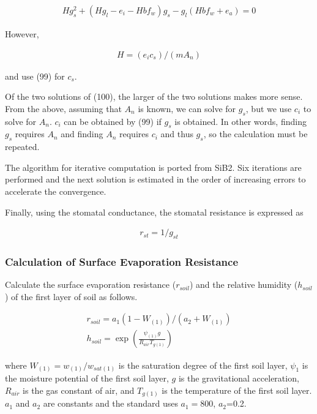 \begin{eqnarray}
 H g_s^2 + ( H g_l - e_i - H b f_w ) g_s - g_l ( H b f_w + e_a ) = 0
\end{eqnarray}

However,

\begin{eqnarray}
 H = (e_i c_s)/(m A_n)
\end{eqnarray}

and use (99) for \(c_s\).

Of the two solutions of (100), the larger of the two solutions makes
more sense. From the above, assuming that \(A_n\) is known, we can solve
for \(g_s\), but we use \(c_i\) to solve for \(A_n\). \(c_i\) can be
obtained by (99) if \(g_s\) is obtained. In other words, finding \(g_s\)
requires \(A_n\) and finding \(A_n\) requires \(c_i\) and thus \(g_s\),
so the calculation must be repeated.

The algorithm for iterative computation is ported from SiB2. Six
iterations are performed and the next solution is estimated in the order
of increasing errors to accelerate the convergence.

Finally, using the stomatal conductance, the stomatal resistance is
expressed as

\begin{eqnarray}
 r_{st} = 1/g_{st}
\end{eqnarray}

\hypertarget{calculation-of-surface-evaporation-resistance}{%
\subsubsection{Calculation of Surface Evaporation
Resistance}\label{calculation-of-surface-evaporation-resistance}}

Calculate the surface evaporation resistance (\(r_{soil}\)) and the
relative humidity (\(h_{soil}\)) of the first layer of soil as follows.

\begin{eqnarray}
 r_{soil} = a_1 ( 1 - W_{(1)} ) / ( a_2 + W_{(1)} ) \\
 h_{soil} = \exp \left(\frac{\psi_{(1)} g}{R_{air} T_{g(1)}} \right)
\end{eqnarray}

where \(W_{(1)} = w_{(1)}/w_{sat(1)}\) is the saturation degree of the
first soil layer, \(\psi_{1}\) is the moisture potential of the first
soil layer, \(g\) is the gravitational acceleration, \(R_{air}\) is the
gas constant of air, and \(T_{g(1)}\) is the temperature of the first
soil layer. \(a_1\) and \(a_2\) are constants and the standard uses
\(a_1=800\), \(a_2\)=0.2.

